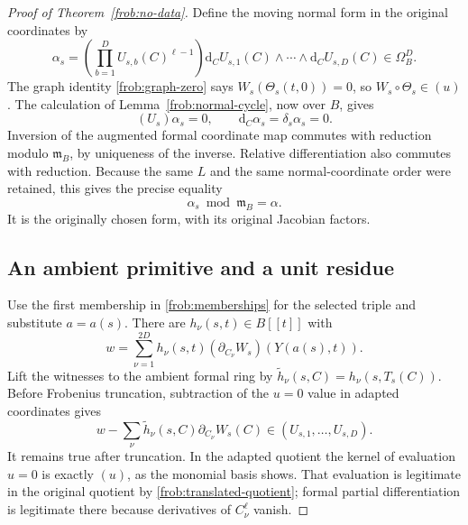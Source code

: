 \begin{proof}[Proof of Theorem~\ref{frob:no-data}]
Define the moving normal form in the original coordinates by
\begin{equation}
 \alpha_s=\left(\prod_{b=1}^D U_{s,b}(C)^{\ell-1}\right)
             \mathrm d_CU_{s,1}(C)\wedge\cdots\wedge\mathrm d_CU_{s,D}(C)
                       \in\Omega_B^D.
 \label{frob:moving-normal}
\end{equation}
The graph identity \eqref{frob:graph-zero} says
$W_s(\Theta_s(t,0))=0$, so $W_s\circ\Theta_s\in(u)$.
The calculation of Lemma~\ref{frob:normal-cycle}, now over $B$, gives
\begin{equation}
 (U_s)\alpha_s=0,\qquad
            \mathrm d_C\alpha_s=\delta_s\alpha_s=0.
 \label{frob:moving-normal-identities}
\end{equation}
Inversion of the augmented formal coordinate map commutes with
reduction modulo $\mathfrak m_B$, by uniqueness of the inverse.
Relative differentiation also commutes with reduction.  Because the
same $L$ and the same normal-coordinate order were retained, this
gives the precise equality
\begin{equation}
                       \alpha_s\bmod\mathfrak m_B=\alpha.
 \label{frob:alpha-reduction}
\end{equation}
It is the originally chosen form, with its original Jacobian factors.

\subsection{An ambient primitive and a unit residue}
\label{frob:contradiction}

Use the first membership in \eqref{frob:memberships} for the selected
triple and substitute $a=a(s)$.  There are $h_\nu(s,t)\in B[[t]]$ with
\begin{equation}
 w=\sum_{\nu=1}^{2D}h_\nu(s,t)
                   (\partial_{C_\nu}W_s)(Y(a(s),t)).
 \label{frob:w-restricted}
\end{equation}
Lift the witnesses to the ambient formal ring by
$\widetilde h_\nu(s,C)=h_\nu(s,T_s(C))$.  Before Frobenius truncation,
subtraction of the $u=0$ value in adapted coordinates gives
\begin{equation}
 w-\sum_\nu\widetilde h_\nu(s,C)\partial_{C_\nu}W_s(C)
                                      \in(U_{s,1},\ldots,U_{s,D}).
 \label{frob:w-discrepancy}
\end{equation}
It remains true after truncation.  In the adapted quotient the kernel
of evaluation $u=0$ is exactly $(u)$, as the monomial basis shows.
That evaluation is legitimate in the original quotient by
\eqref{frob:translated-quotient}; formal partial differentiation is
legitimate there because derivatives of $C_\nu^\ell$ vanish.


\end{proof}
